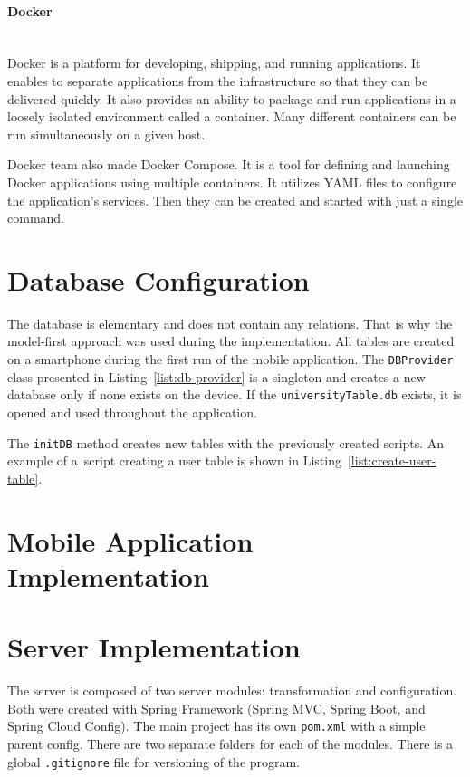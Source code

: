 \paragraph{\large{Docker}}\mbox{}\\[2pt]
Docker is a platform for developing, shipping, and running applications. It enables to separate applications from the infrastructure so that they can be delivered quickly. It also provides an ability to package and run applications in a loosely isolated environment called a container. Many different containers can be run simultaneously on a given host.~\cite{docker}

Docker team also made Docker Compose. It is a tool for defining and launching Docker applications using multiple containers. It utilizes YAML files to configure the application’s services. Then they can be created and started with just a single command.~\cite{docker-compose}

\section{Database Configuration}
The database is elementary and does not contain any relations. That is why the model-first approach was used during the implementation. All tables are created on a smartphone during the first run of the mobile application. The \texttt{DBProvider} class presented in Listing~\ref{list:db-provider} is a singleton and creates a new database only if none exists on the device. If the \texttt{universityTable.db} exists, it is opened and used throughout the application.



 The \texttt{initDB} method creates new tables with the previously created scripts. An example of a~script creating a user table is shown in Listing~\ref{list:create-user-table}.



\section{Mobile Application Implementation}

\section{Server Implementation}
The server is composed of two server modules: transformation and configuration. Both were created with Spring Framework (Spring MVC, Spring Boot, and Spring Cloud Config). The main project has its own \texttt{pom.xml} with a simple parent config. There are two separate folders for each of the modules. There is a global \texttt{.gitignore} file for versioning of the program.

